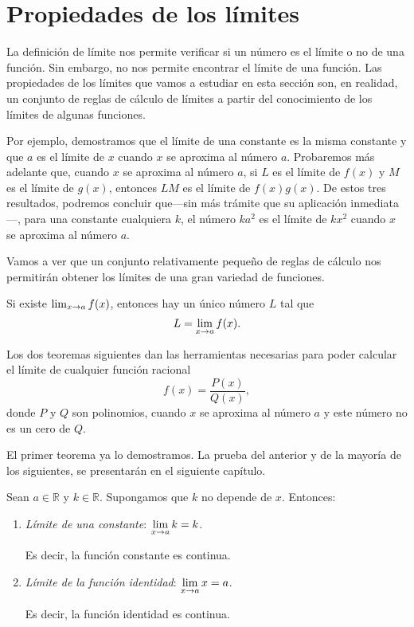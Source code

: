 \section{Propiedades de los límites}
La definición de límite nos permite verificar si un número es el límite o no de una función. Sin
embargo, no nos permite encontrar el límite de una función. Las propiedades de los límites que
vamos a estudiar en esta sección son, en realidad, un conjunto de reglas de cálculo de límites a
partir del conocimiento de los límites de algunas funciones.

Por ejemplo, demostramos que el límite de una constante es la misma constante y que $a$ es el
límite de $x$ cuando $x$ se aproxima al número $a$. Probaremos más adelante que, cuando $x$ se
aproxima al número $a$, si $L$ es el límite de $f(x)$ y $M$ es el límite de $g(x)$, entonces $LM$
es el límite de $f(x)g(x)$. De estos tres resultados, podremos concluir que---sin más trámite que
su aplicación inmediata---, para una constante cualquiera $k$, el número $ka^2$ es el límite de
$kx^2$ cuando $x$ se aproxima al número $a$.

Vamos a ver que un conjunto relativamente pequeño de reglas de cálculo nos permitirán obtener los
límites de una gran variedad de funciones.

\begin{teocal}\label{teol:Unicidad} Si existe $\limjc{f(x)}{x}{a}$, entonces hay un único número $L$ tal que
\[
L = \limjc{f(x)}{x}{a}.
\]
\end{teocal}

Los dos teoremas siguientes dan las herramientas necesarias para poder calcular el límite de
cualquier función racional
\[
f(x) = \frac{P(x)}{Q(x)},
\]
donde $P$ y $Q$ son polinomios, cuando $x$ se aproxima al número $a$ y este número no es un cero de
$Q$.

El primer teorema ya lo demostramos. La prueba del anterior y de la mayoría de los siguientes, se
presentarán en el siguiente capítulo.

\begin{teocal}\label{teol:ConstanteIdentidad} Sean $a\in\mathbb{R}$ y
$k\in\mathbb{R}$. Supongamos que $k$ no depende de $x$. Entonces:
\begin{enumerate}
\item \emph{Límite de una constante}: $\displaystyle{\limjc{k}{x}{a} = k}$.

   Es decir, la función constante es continua.

\item \emph{Límite de la función identidad}: $\displaystyle{\limjc{x}{x}{a} = a}$.

   Es decir, la función identidad es continua.
\end{enumerate}\end{teocal}

